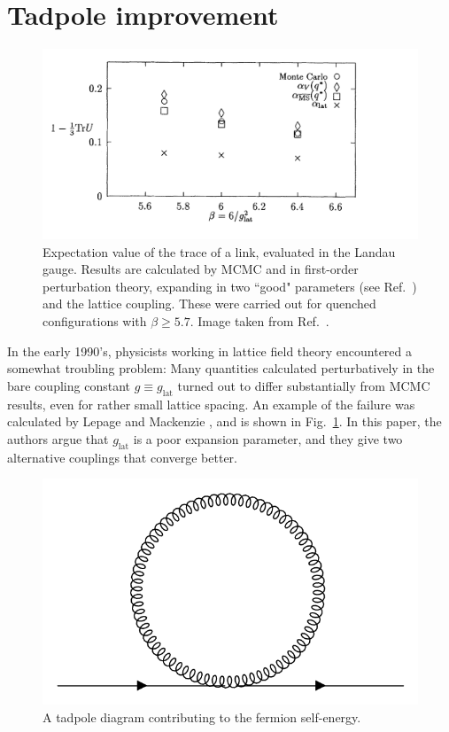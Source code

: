 \section{Tadpole improvement}

\begin{figure}
  \centering
  \includegraphics[width=\linewidth]{figs/averageLink.png}
  \caption{Expectation value of the trace of a link, evaluated in the
           Landau gauge. Results are calculated by MCMC and in first-order
           perturbation theory, expanding in two ``good" parameters
           (see Ref.~\cite{lepage_viability_1993}) and the lattice
           coupling. These were carried out for quenched configurations
           with $\beta\geq5.7$. Image taken from 
           Ref.~\cite{lepage_viability_1993}.}
  \label{fig:averageLink}
\end{figure}

In the early 1990's, physicists working in lattice field theory encountered
a somewhat troubling problem: Many quantities calculated perturbatively
in the bare coupling constant $g\equiv g_\text{lat}$ turned out to differ
substantially from MCMC results, even for rather small lattice spacing.
An example of the failure was calculated by Lepage and Mackenzie
\cite{lepage_viability_1993}, and is shown in Fig.~\ref{fig:averageLink}.
In this paper, the authors argue that $g_\text{lat}$ is a poor expansion
parameter, and they give two alternative couplings that converge better.

\begin{figure}
  \centering
  \includegraphics[width=0.5\linewidth]{figs/tadpole.png}
  \caption{A tadpole diagram contributing to the fermion self-energy.}
  \label{fig:tadpole}
\end{figure}

